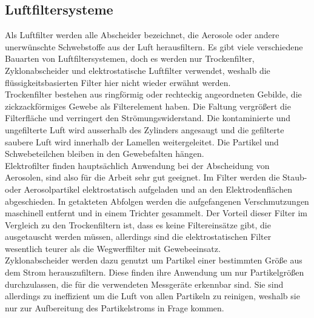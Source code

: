 \subsection{Luftfiltersysteme}
Als Luftfilter werden alle Abscheider bezeichnet, die Aerosole oder andere unerw\"{u}nschte Schwebstoffe aus der Luft herausfiltern. Es gibt viele verschiedene Bauarten von Luftfiltersystemen, doch es werden nur Trockenfilter, Zyklonabscheider und elektrostatische Luftfilter verwendet, weshalb die fl\"{u}ssigkeitsbasierten Filter hier nicht wieder erw\"{a}hnt werden. \\
Trockenfilter bestehen aus ringf\"{o}rmig oder rechteckig angeordneten Gebilde, die zickzackf\"{o}rmiges Gewebe als Filterelement haben. Die Faltung vergr\"{o}{\ss}ert die Filterfl\"{a}che und verringert den Str\"{o}mungswiderstand. Die kontaminierte und ungefilterte Luft wird ausserhalb des Zylinders angesaugt und die gefilterte saubere Luft wird innerhalb der Lamellen weitergeleitet. Die Partikel und Schwebeteilchen bleiben in den Gewebefalten h\"{a}ngen.\\
Elektrofilter finden haupts\"{a}chlich Anwendung bei der Abscheidung von Aerosolen, sind also f\"{u}r die Arbeit sehr gut geeignet. Im Filter werden die Staub- oder Aerosolpartikel elektrostatisch aufgeladen und an den Elektrodenfl\"{a}chen abgeschieden. In getakteten Abfolgen werden die aufgefangenen Verschmutzungen maschinell entfernt und in einem Trichter gesammelt. Der Vorteil dieser Filter im Vergleich zu den Trockenfiltern ist, dass es keine Filtereins\"{a}tze gibt, die ausgetauscht werden m\"{u}ssen, allerdings sind die elektrostatischen Filter wesentlich teurer als die Wegwerffilter mit Gewebeeinsatz.\\
Zyklonabscheider werden dazu genutzt um Partikel einer bestimmten Gr\"{o}{\ss}e aus dem Strom herauszufiltern. Diese finden ihre Anwendung um nur Partikelgr\"{o}{\ss}en durchzulassen, die f\"{u}r die verwendeten Messger\"{a}te erkennbar sind. Sie sind allerdings zu ineffizient um die Luft von allen Partikeln zu reinigen, weshalb sie nur zur Aufbereitung des Partikelstroms in Frage kommen.


